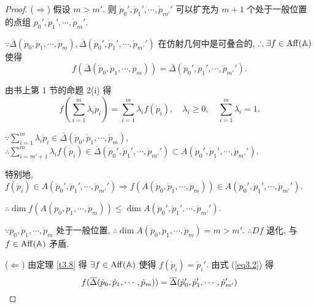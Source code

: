\documentclass{ctexart}
\begin{document}
\begin{proof}
    ($\Rightarrow$) 假设 $m>m'$. 则 $\dot{p}_0',\dot{p}_1',\cdots,\dot{p}_{m'}'$ 可以扩充为 $m+1$ 个处于一般位置的点组 $\dot{p}_0',\dot{p}_1',\cdots,\dot{p}_m'$.
    
    $\because\overline{\Delta}(\dot{p}_0,\dot{p}_1,\cdots,\dot{p}_m),\overline{\Delta}(\dot{p}_0',\dot{p}_1',\cdots,\dot{p}_{m'}')$ 在仿射几何中是可叠合的, $\therefore\exists f\in\operatorname{Aff} (\mathbb{A})$ 使得
    \begin{equation}\label{eq3.2}
        f(\overline{\Delta}(\dot{p}_0,\dot{p}_1,\cdots,\dot{p}_m))=\overline{\Delta}(\dot{p}_0',\dot{p}_1',\cdots,\dot{p}_{m'}').
    \end{equation}


    由书上第 1 节的命题 2(i) 得
    \[f\left(\sum\limits_{i=1}^m\lambda_i\dot{p}_i\right)=\sum\limits_{i=1}^m\lambda_if(\dot{p}_i),\quad\lambda_i\geq0,\quad\sum\limits_{i=1}^m\lambda_i=1.\]

    $\because\sum\limits_{i=1}^m\lambda_i\dot{p}_i\in\overline{\Delta}(\dot{p}_0,\dot{p}_1,\cdots,\dot{p}_m)$, $\therefore\sum\limits_{i=m'+1}^m\lambda_if(\dot{p}_i)\in\overline{\Delta}(\dot{p}_0',\dot{p}_1',\cdots,\dot{p}_{m'}')\subset A(\dot{p}_0',\dot{p}_1',\cdots,\dot{p}_{m'}')$.

    特别地, $f(\dot{p}_i)\in A(\dot{p}_0',\dot{p}_1',\cdots,\dot{p}_{m'}')\Rightarrow f(A(\dot{p}_0,\dot{p}_1,\cdots,\dot{p}_m))\in A(\dot{p}_0',\dot{p}_1',\cdots,\dot{p}_{m'}')$.
    
    $\therefore\dim f(A(\dot{p}_0,\dot{p}_1,\cdots,\dot{p}_m))\leq\dim A(\dot{p}_0',\dot{p}_1',\cdots,\dot{p}_{m'}')$.

    $\because\dot{p}_0,\dot{p}_1,\cdots,\dot{p}_m$ 处于一般位置, $\therefore\dim A(\dot{p}_0,\dot{p}_1,\cdots,\dot{p}_m)=m>m'$. $\therefore Df$ 退化, 与 $f\in\operatorname{Aff} (\mathbb{A})$ 矛盾.

    ($\Leftarrow$) 由定理 \ref{t3.8} 得 $\exists f\in\operatorname{Aff} (\mathbb{A})$ 使得 $f(\dot{p}_i)=\dot{p}_i'$. 由式 (\ref{eq3.2}) 得
    \[f(\overline{\Delta}(\dot{p}_0,\dot{p}_1,\cdots,\dot{p}_m))=\overline{\Delta}(\dot{p}_0',\dot{p}_1',\cdots,\dot{p}_{m'}')\qedhere\]
\end{proof}
\end{document}
